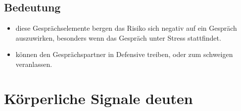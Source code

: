 \documentclass[11pt]{article}
\begin{document}
\subsection{Bedeutung}
\label{sec:orgdb42064}
\begin{itemize}
\item diese Gesprächselemente bergen das Risiko sich negativ auf ein Gespräch auszuwirken, besonders wenn das Gespräch unter Stress stattfindet.
\item können den Gesprächspartner in Defensive treiben, oder zum schweigen veranlassen.
\end{itemize}
\section{Körperliche Signale deuten}
\label{sec:org3fa6d7c}
\end{document}
